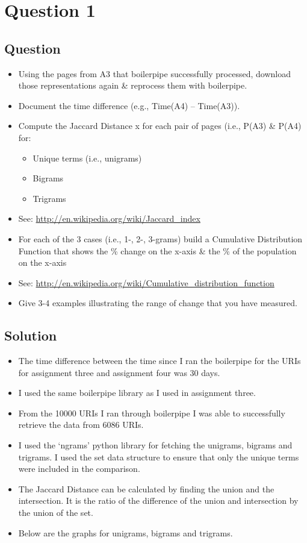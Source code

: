 \chapter{Question 1}
\label{question-1}
\section{Question}

\begin{itemize}
\item Using the pages from A3 that boilerpipe successfully processed, download those representations again \& reprocess them with boilerpipe.
\item Document the time difference (e.g., Time(A4) – Time(A3)).
\item Compute the Jaccard Distance x for each pair of pages (i.e., P(A3) \& P(A4) for:
	\begin{itemize}
		\item Unique terms (i.e., unigrams)
		\item Bigrams
		\item Trigrams
	\end{itemize}
\item See: \url{http://en.wikipedia.org/wiki/Jaccard_index}
\item For each of the 3 cases (i.e., 1-, 2-, 3-grams) build a Cumulative Distribution Function that shows the \% change on the x-axis \& the \% of the population on the x-axis 
\item See: \url{http://en.wikipedia.org/wiki/Cumulative_distribution_function}
\item Give 3-4 examples illustrating the range of change that you have measured.
\end{itemize}


\section{Solution}
\begin{itemize}
\item The time difference between the time since I ran the boilerpipe for the URIs for assignment three and assignment four was 30 days.
\item I used the same boilerpipe library as I used in assignment three.
\item From the 10000 URIs I ran through boilerpipe I was able to successfully retrieve the data from 6086 URIs.
\item I used the `ngrams' python library for fetching the unigrams, bigrams and trigrams. I used the set data structure to ensure that only the unique terms were included in the comparison.
\item The Jaccard Distance can be calculated by finding the union and the intersection. It is the ratio of the difference of the union and intersection by the union of the set.
\item Below are the graphs for unigrams, bigrams and trigrams.
\end{itemize}

